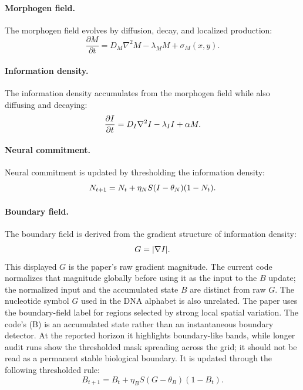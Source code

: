 \paragraph{Morphogen field.}
The morphogen field evolves by diffusion, decay, and localized production:
\begin{equation}
  \frac{\partial M}{\partial t}
  =
  D_M \nabla^2 M - \lambda_M M + \sigma_M(x,y).
\end{equation}

\paragraph{Information density.}
The information density accumulates from the morphogen field while also diffusing and decaying:
\begin{equation}
  \frac{\partial I}{\partial t}
  =
  D_I \nabla^2 I - \lambda_I I + \alpha M.
\end{equation}

\paragraph{Neural commitment.}
Neural commitment is updated by thresholding the information density:
\begin{equation}
  N_{t+1}
  =
  N_t + \eta_N S(I - \theta_N)(1 - N_t).
\end{equation}

\paragraph{Boundary field.}
The boundary field is derived from the gradient structure of information density:
\begin{equation}
  G = |\nabla I|.
\end{equation}
This displayed \(G\) is the paper's raw gradient magnitude. The current code normalizes that magnitude globally before using it as the input to the \(B\) update; the normalized input and the accumulated state \(B\) are distinct from raw \(G\). The nucleotide symbol \(G\) used in the DNA alphabet is also unrelated.
The paper uses the boundary-field label for regions selected by strong local spatial variation. The code's (B) is an accumulated state rather than an instantaneous boundary detector. At the reported horizon it highlights boundary-like bands, while longer audit runs show the thresholded mask spreading across the grid; it should not be read as a permanent stable biological boundary.
It is updated through the following thresholded rule:
\begin{equation}
  B_{t+1}
  =
  B_t + \eta_B S(G - \theta_B)(1 - B_t).
\end{equation}

